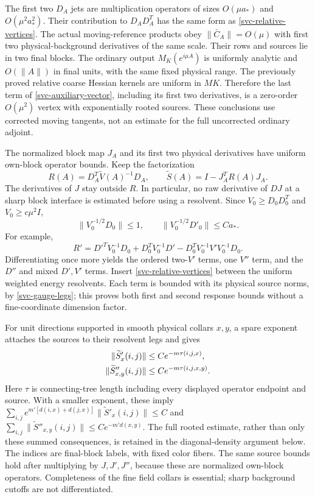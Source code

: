 The first two $D_A$ jets are multiplication operators of sizes
$O(\mu a_*)$ and $O(\mu^2a_*^2)$. Their contribution to
$D_AD_A^T$ has the same form as \eqref{svc-relative-vertices}.
The actual moving-reference products obey
$\|\bar C_A\|=O(\mu)$ with first two physical-background derivatives
of the same scale. Their rows and sources lie in two final blocks.
The ordinary output $M_K(e^{i\mu A})$ is uniformly analytic and
$O(\|A\|)$ in final units, with the same fixed physical range.
The previously proved relative coarse Hessian kernels are uniform
in $MK$. Therefore the last term of
\eqref{svc-auxiliary-vector}, including its first two derivatives,
is a zero-order $O(\mu^2)$ vertex with exponentially rooted sources.
These conclusions use corrected moving tangents, not an estimate
for the full uncorrected ordinary adjoint.

The normalized block map $J_A$ and its first two physical derivatives
have uniform own-block operator bounds. Keep the factorization
\begin{equation}
 R(A)=D_A^T\widetilde V(A)^{-1}D_A,
 \qquad \widetilde S(A)=I-J_A^TR(A)J_A.
 \label{svc-avoid-interface}
\end{equation}
The derivatives of $J$ stay outside $R$. In particular, no raw derivative
of $DJ$ at a sharp block interface is estimated before using a resolvent.
Since $V_0\ge D_0D_0^T$ and $V_0\ge c\mu^2I$,
\begin{equation}
 \|V_0^{-1/2}D_0\|\le1,\qquad
 \|V_0^{-1/2}D'_0\|\le Ca_*.
 \label{svc-gauge-legs}
\end{equation}
For example,
\begin{equation}
 R'=D'^TV_0^{-1}D_0+D_0^TV_0^{-1}D'
           -D_0^TV_0^{-1}V'V_0^{-1}D_0.
 \label{svc-first-response}
\end{equation}
Differentiating once more yields the ordered two-$V'$ terms, one
$V''$ term, and the $D''$ and mixed $D',V'$ terms. Insert
\eqref{svc-relative-vertices} between the uniform weighted energy
resolvents. Each term is bounded with its physical source norms,
by \eqref{svc-gauge-legs}; this proves both first and second response
bounds without a fine-coordinate dimension factor.

For unit directions supported in smooth physical collars $x,y$, a
spare exponent attaches the sources to their resolvent legs and gives
\begin{align}
 \|\widetilde S'_x(i,j)\|&\le Ce^{-m\tau(i,j,x)},\notag\\
 \|\widetilde S''_{x,y}(i,j)\|
      &\le Ce^{-m\tau(i,j,x,y)}.
 \label{svc-rooted-sources}
\end{align}
Here $\tau$ is connecting-tree length including every displayed operator
endpoint and source. With a smaller exponent, these imply
$\sum_{i,j}e^{m'[d(i,x)+d(j,x)]}\|\widetilde S'_x(i,j)\|\le C$
and $\sum_{i,j}\|\widetilde S''_{x,y}(i,j)\|\le Ce^{-m'd(x,y)}$.
The full rooted estimate, rather than only these summed consequences,
is retained in the diagonal-density argument below.
The indices are final-block labels, with fixed color fibers.
The same source bounds hold after multiplying by $J,J',J''$, because
these are normalized own-block operators. Completeness of the fine
field collars is essential; sharp background cutoffs are not differentiated.

